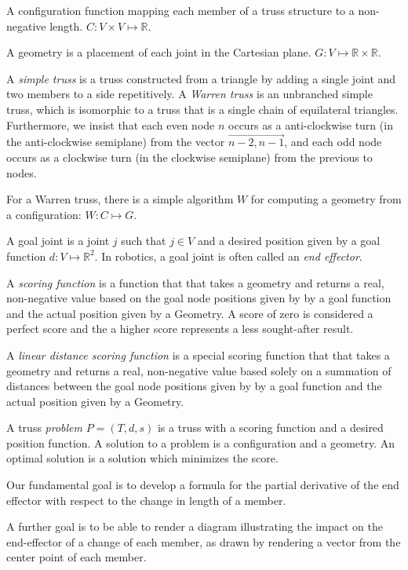 \documentclass[11pt]{article}
\begin{document}
A configuration function mapping each member of a truss structure to a non-negative length. $C: V \times V \mapsto \mathbb{R}$.

A geometry is a placement of each joint in the Cartesian plane. $G: V \mapsto \mathbb{R} \times \mathbb{R} $.

A {\em simple truss} is a truss constructed from a triangle by adding a single joint and two members to a side repetitively.
A {\em Warren truss} is an unbranched simple truss, which is isomorphic to a truss that is a single chain of equilateral triangles.
Furthermore, we insist that each even node $n$ occurs as a anti-clockwise turn (in the anti-clockwise semiplane) from the vector $\overrightarrow{n-2,n-1}$, and
each odd node occurs as a clockwise turn (in the clockwise semiplane) from the previous to nodes.

For a Warren truss, there is a simple algorithm $W$ for computing a geometry from a configuration: $W : C \mapsto G$.

A goal joint is a joint $j$ such that $j \in V$ and a desired position given by a goal function $d : V \mapsto \mathbb{R}^2$. In robotics,
a goal joint is often called an {\em end effector}.

A {\em scoring function} is a function that that takes a geometry and returns a real, non-negative value based on 
the goal node positions given by by a goal function and the actual position given by a Geometry. A score of zero is considered
 a perfect score and the a higher score represents a less sought-after result.

A {\em linear distance scoring function} is a special scoring function that that takes a geometry and returns a real, non-negative value based solely
on a summation of distances between the goal node positions given by by a goal function and the actual position given by a Geometry.

A truss {\em problem} $P = (T,d,s)$ is a truss with a scoring function and a desired position function.
A solution to a problem is a configuration and a geometry. An optimal solution is a solution which minimizes the score.

Our fundamental goal is to develop a formula for the partial derivative of the end effector
with respect to the change in length of a member.

A further goal is to be able to render a diagram illustrating the impact on the end-effector
of a change of each member, as drawn by rendering a vector from the center point of each member.
\end{document}

